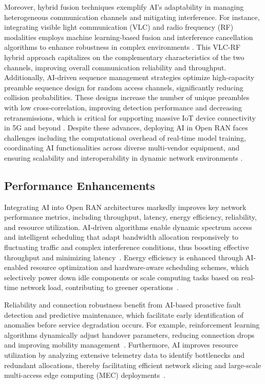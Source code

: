 \documentclass[sigconf]{acmart}
\begin{document}
Moreover, hybrid fusion techniques exemplify AI’s adaptability in managing heterogeneous communication channels and mitigating interference. For instance, integrating visible light communication (VLC) and radio frequency (RF) modalities employs machine learning-based fusion and interference cancellation algorithms to enhance robustness in complex environments \cite{ref25}. This VLC-RF hybrid approach capitalizes on the complementary characteristics of the two channels, improving overall communication reliability and throughput. Additionally, AI-driven sequence management strategies optimize high-capacity preamble sequence design for random access channels, significantly reducing collision probabilities. These designs increase the number of unique preambles with low cross-correlation, improving detection performance and decreasing retransmissions, which is critical for supporting massive IoT device connectivity in 5G and beyond \cite{ref21}. Despite these advances, deploying AI in Open RAN faces challenges including the computational overhead of real-time model training, coordinating AI functionalities across diverse multi-vendor equipment, and ensuring scalability and interoperability in dynamic network environments \cite{ref49,ref54}.

\subsection{Performance Enhancements}

Integrating AI into Open RAN architectures markedly improves key network performance metrics, including throughput, latency, energy efficiency, reliability, and resource utilization. AI-driven algorithms enable dynamic spectrum access and intelligent scheduling that adapt bandwidth allocation responsively to fluctuating traffic and complex interference conditions, thus boosting effective throughput and minimizing latency~\cite{ref54}. Energy efficiency is enhanced through AI-enabled resource optimization and hardware-aware scheduling schemes, which selectively power down idle components or scale computing tasks based on real-time network load, contributing to greener operations~\cite{ref49}.

Reliability and connection robustness benefit from AI-based proactive fault detection and predictive maintenance, which facilitate early identification of anomalies before service degradation occurs. For example, reinforcement learning algorithms dynamically adjust handover parameters, reducing connection drops and improving mobility management~\cite{ref54}. Furthermore, AI improves resource utilization by analyzing extensive telemetry data to identify bottlenecks and redundant allocations, thereby facilitating efficient network slicing and large-scale multi-access edge computing (MEC) deployments~\cite{ref49}.
\end{document}
